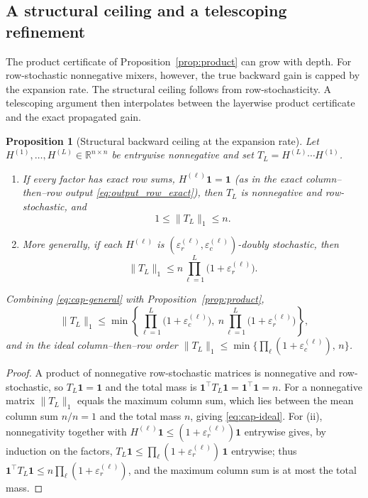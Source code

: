 \documentclass[10pt]{article}
\numberwithin{equation}{section}
\theoremstyle{plain}
\newtheorem{proposition}[theorem]{Proposition}
\theoremstyle{definition}
\theoremstyle{remark}
\newcommand{\R}{\mathbb{R}}
\newcommand{\ones}{\mathbf{1}}
\begin{document}
\subsection{A structural ceiling and a telescoping refinement}\label{subsec:ceiling}

The product certificate of Proposition~\ref{prop:product} can grow with depth. For
row-stochastic nonnegative mixers, however, the true backward gain is capped by
the expansion rate. The structural ceiling follows from row-stochasticity. A telescoping argument then
interpolates between the layerwise product certificate and the exact propagated gain.

\begin{proposition}[Structural backward ceiling at the expansion rate]\label{prop:cap-n}
Let $H^{(1)},\dots,H^{(L)}\in\R^{n\times n}$ be entrywise nonnegative and set
$T_L=H^{(L)}\cdots H^{(1)}$.
\begin{enumerate}[label=(\roman*),leftmargin=*,itemsep=0.2em]
\item If every factor has exact row sums, $H^{(\ell)}\ones=\ones$ (as in the exact column--then--row output \eqref{eq:output_row_exact}), then $T_L$ is
nonnegative and row-stochastic, and
\begin{equation}\label{eq:cap-ideal}
1\le \|T_L\|_1\le n .
\end{equation}
\item More generally, if each $H^{(\ell)}$ is
$(\varepsilon_r^{(\ell)},\varepsilon_c^{(\ell)})$-doubly stochastic, then
\begin{equation}\label{eq:cap-general}
\|T_L\|_1\le n\prod_{\ell=1}^L\bigl(1+\varepsilon_r^{(\ell)}\bigr).
\end{equation}
\end{enumerate}
Combining \eqref{eq:cap-general} with Proposition~\ref{prop:product},
\begin{equation}\label{eq:cap-min}
\|T_L\|_1
\le
\min\!\left\{\prod_{\ell=1}^L\bigl(1+\varepsilon_c^{(\ell)}\bigr),\
n\prod_{\ell=1}^L\bigl(1+\varepsilon_r^{(\ell)}\bigr)\right\},
\end{equation}
and in the ideal column--then--row order
$\|T_L\|_1\le\min\bigl\{\prod_\ell(1+\varepsilon_c^{(\ell)}),\,n\bigr\}$.
\end{proposition}

\begin{proof}
A product of nonnegative row-stochastic matrices is nonnegative and row-stochastic, so
$T_L\ones=\ones$ and the total mass is $\ones^\top T_L\ones=\ones^\top\ones=n$. For a
nonnegative matrix $\|T_L\|_1$ equals the maximum column sum, which lies between the mean
column sum $n/n=1$ and the total mass $n$, giving \eqref{eq:cap-ideal}. For (ii),
nonnegativity together with $H^{(\ell)}\ones\le(1+\varepsilon_r^{(\ell)})\ones$ entrywise
gives, by induction on the factors,
$T_L\ones\le\prod_\ell(1+\varepsilon_r^{(\ell)})\,\ones$ entrywise; thus
$\ones^\top T_L\ones\le n\prod_\ell(1+\varepsilon_r^{(\ell)})$, and the maximum column sum
is at most the total mass.
\end{proof}
\end{document}
